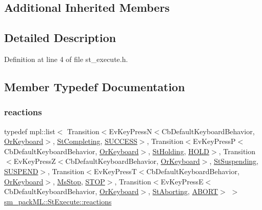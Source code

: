 \subsection*{Additional Inherited Members}


\subsection{Detailed Description}


Definition at line 4 of file st\+\_\+execute.\+h.



\subsection{Member Typedef Documentation}
\mbox{\label{structsm__packML_1_1StExecute_ad5e5ad84974f2f723cd1b9914ab161da}} 
\subsubsection{\texorpdfstring{reactions}{reactions}}
{\footnotesize\ttfamily typedef mpl\+::list$<$ Transition$<$Ev\+Key\+PressN$<$Cb\+Default\+Keyboard\+Behavior, \hyperlink{classsm__packML_1_1OrKeyboard}{Or\+Keyboard}$>$, \hyperlink{structsm__packML_1_1StCompleting}{St\+Completing}, \hyperlink{classSUCCESS}{S\+U\+C\+C\+E\+SS}$>$, Transition$<$Ev\+Key\+PressP$<$Cb\+Default\+Keyboard\+Behavior, \hyperlink{classsm__packML_1_1OrKeyboard}{Or\+Keyboard}$>$, \hyperlink{structsm__packML_1_1StHolding}{St\+Holding}, \hyperlink{structsm__packML_1_1StExecute_1_1HOLD}{H\+O\+LD}$>$, Transition$<$Ev\+Key\+PressZ$<$Cb\+Default\+Keyboard\+Behavior, \hyperlink{classsm__packML_1_1OrKeyboard}{Or\+Keyboard}$>$, \hyperlink{structsm__packML_1_1StSuspending}{St\+Suspending}, \hyperlink{structsm__packML_1_1StExecute_1_1SUSPEND}{S\+U\+S\+P\+E\+ND}$>$, Transition$<$Ev\+Key\+PressT$<$Cb\+Default\+Keyboard\+Behavior, \hyperlink{classsm__packML_1_1OrKeyboard}{Or\+Keyboard}$>$, \hyperlink{classsm__packML_1_1MsStop}{Ms\+Stop}, \hyperlink{structsm__packML_1_1StExecute_1_1STOP}{S\+T\+OP}$>$, Transition$<$Ev\+Key\+PressE$<$Cb\+Default\+Keyboard\+Behavior, \hyperlink{classsm__packML_1_1OrKeyboard}{Or\+Keyboard}$>$, \hyperlink{structsm__packML_1_1StAborting}{St\+Aborting}, \hyperlink{classABORT}{A\+B\+O\+RT}$>$ $>$ \hyperlink{structsm__packML_1_1StExecute_ad5e5ad84974f2f723cd1b9914ab161da}{sm\+\_\+pack\+M\+L\+::\+St\+Execute\+::reactions}}



